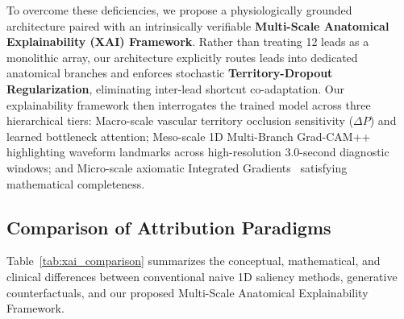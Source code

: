 \documentclass[5p,twocolumn,10pt]{elsarticle}
\begin{document}
To overcome these deficiencies, we propose a physiologically grounded architecture paired with an intrinsically verifiable \textbf{Multi-Scale Anatomical Explainability (XAI) Framework}. Rather than treating 12 leads as a monolithic array, our architecture explicitly routes leads into dedicated anatomical branches and enforces stochastic \textbf{Territory-Dropout Regularization}, eliminating inter-lead shortcut co-adaptation. Our explainability framework then interrogates the trained model across three hierarchical tiers: Macro-scale vascular territory occlusion sensitivity ($\Delta P$) and learned bottleneck attention; Meso-scale 1D Multi-Branch Grad-CAM++~\cite{chattopadhay2018grad} highlighting waveform landmarks across high-resolution 3.0-second diagnostic windows; and Micro-scale axiomatic Integrated Gradients~\cite{sundararajan2017axiomatic} satisfying mathematical completeness.

\subsection{Comparison of Attribution Paradigms}
Table~\ref{tab:xai_comparison} summarizes the conceptual, mathematical, and clinical differences between conventional naive 1D saliency methods, generative counterfactuals, and our proposed Multi-Scale Anatomical Explainability Framework.
\end{document}
